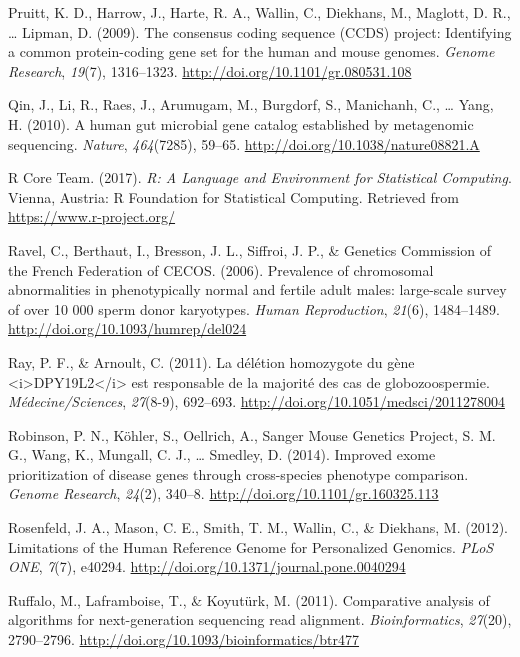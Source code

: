 \documentclass[12pt,twoside]{reedthesis}
\theoremstyle{definition}
\theoremstyle{definition}
\theoremstyle{remark}
\begin{document}
  \hypertarget{ref-Pruitt2009}{}
  Pruitt, K. D., Harrow, J., Harte, R. A., Wallin, C., Diekhans, M.,
  Maglott, D. R., \ldots{} Lipman, D. (2009). The consensus coding
  sequence (CCDS) project: Identifying a common protein-coding gene set
  for the human and mouse genomes. \emph{Genome Research}, \emph{19}(7),
  1316--1323. \url{http://doi.org/10.1101/gr.080531.108}
  
  \hypertarget{ref-Qin2010}{}
  Qin, J., Li, R., Raes, J., Arumugam, M., Burgdorf, S., Manichanh, C.,
  \ldots{} Yang, H. (2010). A human gut microbial gene catalog established
  by metagenomic sequencing. \emph{Nature}, \emph{464}(7285), 59--65.
  \url{http://doi.org/10.1038/nature08821.A}
  
  \hypertarget{ref-RCoreTeam2017}{}
  R Core Team. (2017). \emph{R: A Language and Environment for Statistical
  Computing}. Vienna, Austria: R Foundation for Statistical Computing.
  Retrieved from \url{https://www.r-project.org/}
  
  \hypertarget{ref-Ravel2006}{}
  Ravel, C., Berthaut, I., Bresson, J. L., Siffroi, J. P., \& Genetics
  Commission of the French Federation of CECOS. (2006). Prevalence of
  chromosomal abnormalities in phenotypically normal and fertile adult
  males: large-scale survey of over 10 000 sperm donor karyotypes.
  \emph{Human Reproduction}, \emph{21}(6), 1484--1489.
  \url{http://doi.org/10.1093/humrep/del024}
  
  \hypertarget{ref-Ray2011}{}
  Ray, P. F., \& Arnoult, C. (2011). La délétion homozygote du gène
  \textless{}i\textgreater{}DPY19L2\textless{}/i\textgreater{} est
  responsable de la majorité des cas de globozoospermie.
  \emph{Médecine/Sciences}, \emph{27}(8-9), 692--693.
  \url{http://doi.org/10.1051/medsci/2011278004}
  
  \hypertarget{ref-Robinson2014}{}
  Robinson, P. N., Köhler, S., Oellrich, A., Sanger Mouse Genetics
  Project, S. M. G., Wang, K., Mungall, C. J., \ldots{} Smedley, D.
  (2014). Improved exome prioritization of disease genes through
  cross-species phenotype comparison. \emph{Genome Research},
  \emph{24}(2), 340--8. \url{http://doi.org/10.1101/gr.160325.113}
  
  \hypertarget{ref-Rosenfeld2012}{}
  Rosenfeld, J. A., Mason, C. E., Smith, T. M., Wallin, C., \& Diekhans,
  M. (2012). Limitations of the Human Reference Genome for Personalized
  Genomics. \emph{PLoS ONE}, \emph{7}(7), e40294.
  \url{http://doi.org/10.1371/journal.pone.0040294}
  
  \hypertarget{ref-Ruffalo2011}{}
  Ruffalo, M., Laframboise, T., \& Koyutürk, M. (2011). Comparative
  analysis of algorithms for next-generation sequencing read alignment.
  \emph{Bioinformatics}, \emph{27}(20), 2790--2796.
  \url{http://doi.org/10.1093/bioinformatics/btr477}
  
\end{document}
